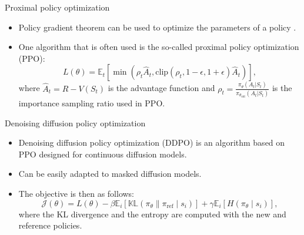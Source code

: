 \documentclass[normaltitle,first=orange,second=red,leqno]{aaltoslides}
\begin{document}
\begin{frame}{Proximal policy optimization}
    \begin{itemize}
        \item<1-> Policy gradient theorem can be used to optimize the parameters of a policy \cite{SuttonAndBarto2018}.
        \item<2-> One algorithm that is often used is the so-called proximal policy optimization (PPO):
        \begin{equation*}
            L(\theta) = \mathbb{E}_t[\min(\rho_t\hat{A}_t, \text{clip}(\rho_t, 1 - \epsilon, 1 + \epsilon)\hat{A}_t)],
        \end{equation*}
        where $\hat{A}_t = R - V(S_t)$ is the advantage function and $\rho_t = \frac{\pi_\theta(A_t | S_t)}{\pi_{\theta_\text{old}}(A_t | S_t)}$ is the importance sampling ratio used in PPO.
    \end{itemize}
\end{frame}

\begin{frame}{Denoising diffusion policy optimization}
    \begin{itemize}
        \item<1-> Denoising diffusion policy optimization (DDPO) is an algorithm based on PPO designed for continuous diffusion models.
        \item<2-> Can be easily adapted to masked diffusion models.
        \item<3-> The objective is then as follows:
        \begin{equation*}
            \mathcal{J}(\theta) = L(\theta) - \beta\mathbb{E}_i\left[\mathbb{KL}(\pi_\theta \parallel \pi_\text{ref} \mid s_i)\right] + \gamma \mathbb{E}_i\left[H(\pi_\theta \mid s_i)\right],
        \end{equation*}
        where the KL divergence and the entropy are computed with the new and reference policies.
    \end{itemize}
\end{frame}
\end{document}

